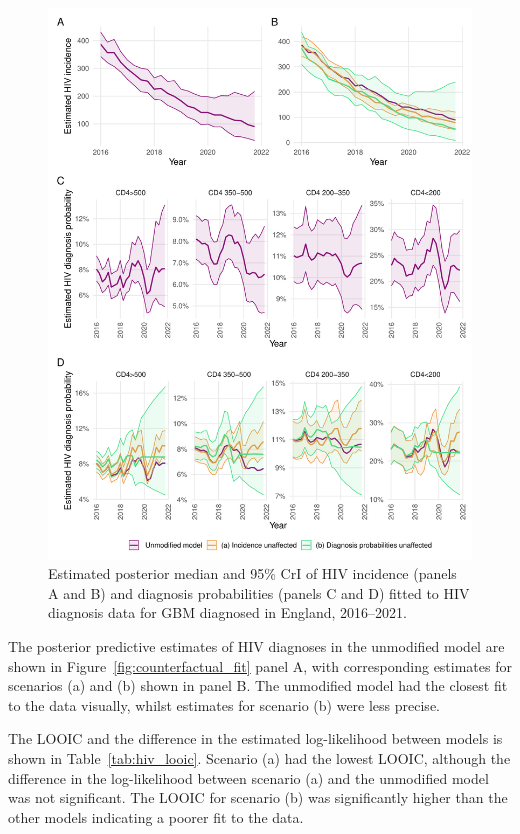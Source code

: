 \begin{figure}[htbp!]
  \centering
  \includegraphics[width=\textwidth]{counterfactual_estimates.pdf}
  \caption[Estimated posterior median and 95\% CrI of HIV incidence and diagnosis probabilities fitted to HIV diagnosis data for GBM diagnosed in England, 2016--2021]{Estimated posterior median and 95\% CrI of HIV incidence (panels A and B) and diagnosis probabilities (panels C and D) fitted to HIV diagnosis data for GBM diagnosed in England, 2016--2021.}\label{fig:counterfactual_estimates}
\end{figure}

The posterior predictive estimates of HIV diagnoses in the unmodified model are shown in Figure~\ref{fig:counterfactual_fit} panel A, with corresponding estimates for scenarios (a) and (b) shown in panel B. The unmodified model had the closest fit to the data visually, whilst estimates for scenario (b) were less precise.

The LOOIC and the difference in the estimated log-likelihood between models is shown in Table~\ref{tab:hiv_looic}. Scenario (a) had the lowest LOOIC, although the difference in the log-likelihood between scenario (a) and the unmodified model was not significant. The LOOIC for scenario (b) was significantly higher than the other models indicating a poorer fit to the data.

